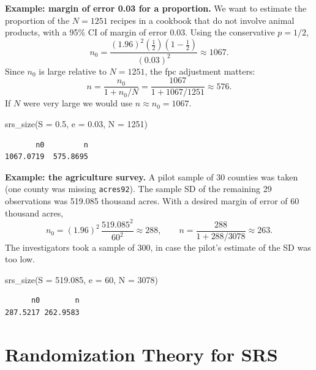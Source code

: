 \documentclass[
  letterpaper,
  DIV=11,
  numbers=noendperiod]{scrreprt}
\newenvironment{Shaded}{\begin{snugshade}}{\end{snugshade}}
\newcommand{\AttributeTok}[1]{\textcolor[rgb]{0.40,0.45,0.13}{#1}}
\newcommand{\DecValTok}[1]{\textcolor[rgb]{0.68,0.00,0.00}{#1}}
\newcommand{\FloatTok}[1]{\textcolor[rgb]{0.68,0.00,0.00}{#1}}
\newcommand{\FunctionTok}[1]{\textcolor[rgb]{0.28,0.35,0.67}{#1}}
\newcommand{\NormalTok}[1]{\textcolor[rgb]{0.00,0.23,0.31}{#1}}
\renewcommand{\[}{\begin{equation}}
\renewcommand{\]}{\end{equation}}
\begin{document}
\textbf{Example: margin of error 0.03 for a proportion.} We want to
estimate the proportion of the \(N=1251\) recipes in a cookbook that do
not involve animal products, with a 95\% CI of margin of error 0.03.
Using the conservative \(p = 1/2\), \[
n_0 = \frac{(1.96)^2 (\tfrac12)(1-\tfrac12)}{(0.03)^2} \approx 1067 .
\] Since \(n_0\) is large relative to \(N=1251\), the fpc adjustment
matters: \[
n = \frac{n_0}{1+n_0/N} = \frac{1067}{1+1067/1251} \approx 576 .
\] If \(N\) were very large we would use \(n\approx n_0 = 1067\).

\begin{Shaded}
\begin{Highlighting}[]
\FunctionTok{srs\_size}\NormalTok{(}\AttributeTok{S =} \FloatTok{0.5}\NormalTok{, }\AttributeTok{e =} \FloatTok{0.03}\NormalTok{, }\AttributeTok{N =} \DecValTok{1251}\NormalTok{)}
\end{Highlighting}
\end{Shaded}

\begin{verbatim}
       n0         n 
1067.0719  575.8695 
\end{verbatim}

\textbf{Example: the agriculture survey.} A pilot sample of 30 counties
was taken (one county was missing \texttt{acres92}). The sample SD of
the remaining 29 observations was 519.085 thousand acres. With a desired
margin of error of 60 thousand acres, \[
n_0 = (1.96)^2\,\frac{519.085^2}{60^2} \approx 288,
\qquad
n = \frac{288}{1+288/3078} \approx 263 .
\] The investigators took a sample of 300, in case the pilot's estimate
of the SD was too low.

\begin{Shaded}
\begin{Highlighting}[]
\FunctionTok{srs\_size}\NormalTok{(}\AttributeTok{S =} \FloatTok{519.085}\NormalTok{, }\AttributeTok{e =} \DecValTok{60}\NormalTok{, }\AttributeTok{N =} \DecValTok{3078}\NormalTok{)}
\end{Highlighting}
\end{Shaded}

\begin{verbatim}
      n0        n 
287.5217 262.9583 
\end{verbatim}

\section{Randomization Theory for SRS}\label{sec-srs-randomization}
\end{document}
